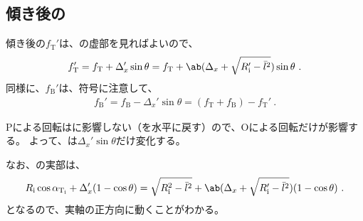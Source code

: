 \subsection{傾き後の\AlocationLength}
傾き後の\TopReAlocationLength$f_\mathrm T'$は、の虚部を見ればよいので、
\begin{align}
  \label{eq:realocationT}
  f_\mathrm T'
  = f_\mathrm T+\Delta_x'\sin\theta
  = f_\mathrm T+\ab(\Delta_x+\sqrt{R_\mathrm i'-\bar l^2})\sin\theta\ .
\end{align}
同様に、\BottomReAlocationLength$f_\mathrm B'$は、符号に注意して、
\begin{align*}
  f_\mathrm B' = f_\mathrm B-\Delta_x'\sin\theta = (f_\mathrm T+f_\mathrm B)-f_\mathrm T'\ .
\end{align*}
\begin{hosoku}
\TableCenter Pによる回転は\AlocationLength に影響しない（\EndFace を水平に戻す）ので、\CurvatureCenter Oによる回転だけが影響する。
よって、\AlocationLength は$\Delta_x'\sin\theta$だけ変化する。
\end{hosoku}
なお、の実部は、
\begin{align*}
  R_\mathrm i\cos\alpha_{\mathrm T_\mathrm i}+\Delta_x'(1-\cos\theta)
  = \sqrt{R_\mathrm i^2-\bar l^2}+\ab(\Delta_x+\sqrt{R_\mathrm i'-\bar l^2})(1-\cos\theta)\ .
\end{align*}
となるので、実軸の正方向に動くことがわかる。


